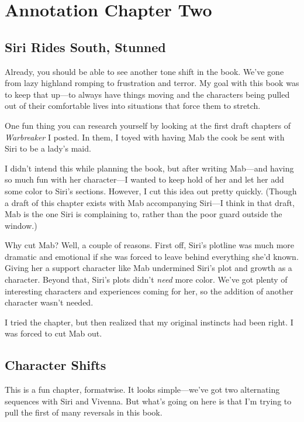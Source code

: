 \section{Annotation Chapter Two}

\subsection*{Siri Rides South, Stunned}

Already, you should be able to see another tone shift in the book. We’ve gone from lazy highland romping to frustration and terror. My goal with this book was to keep that up—to always have things moving and the characters being pulled out of their comfortable lives into situations that force them to stretch.

One fun thing you can research yourself by looking at the first draft chapters of \textit{Warbreaker} I posted. In them, I toyed with having Mab the cook be sent with Siri to be a lady’s maid.

I didn’t intend this while planning the book, but after writing Mab—and having so much fun with her character—I wanted to keep hold of her and let her add some color to Siri’s sections. However, I cut this idea out pretty quickly. (Though a draft of this chapter exists with Mab accompanying Siri—I think in that draft, Mab is the one Siri is complaining to, rather than the poor guard outside the window.)

Why cut Mab? Well, a couple of reasons. First off, Siri’s plotline was much more dramatic and emotional if she was forced to leave behind everything she’d known. Giving her a support character like Mab undermined Siri’s plot and growth as a character. Beyond that, Siri’s plots didn’t \textit{need} more color. We’ve got plenty of interesting characters and experiences coming for her, so the addition of another character wasn’t needed.

I tried the chapter, but then realized that my original instincts had been right. I was forced to cut Mab out.

\subsection*{Character Shifts}

This is a fun chapter, formatwise. It looks simple—we’ve got two alternating sequences with Siri and Vivenna. But what’s going on here is that I’m trying to pull the first of many reversals in this book.

